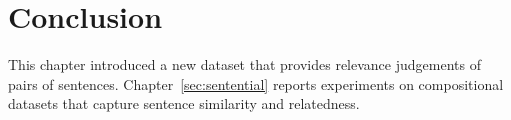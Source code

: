 \section{Conclusion}
\label{sec:phraserel-conclusion}

This chapter introduced a new dataset that provides relevance judgements of pairs of sentences. Chapter~\ref{sec:sentential} reports experiments on compositional datasets that capture sentence similarity and relatedness.

